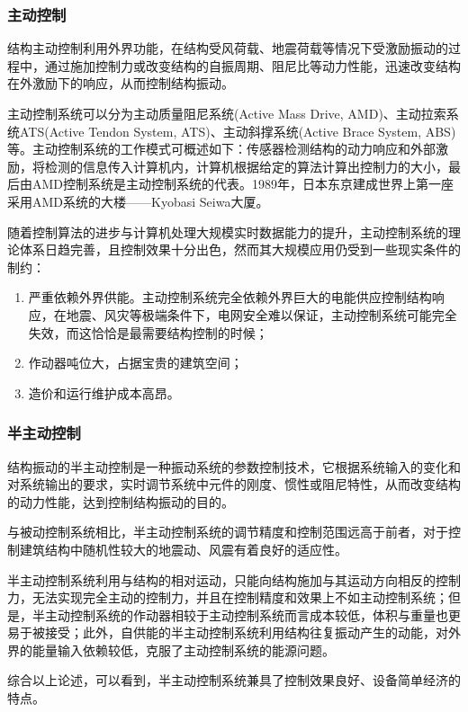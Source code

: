 \subsubsection{主动控制}
结构主动控制利用外界功能，在结构受风荷载、地震荷载等情况下受激励振动的过程中，通过施加控制力或改变结构的自振周期、阻尼比等动力性能，迅速改变结构在外激励下的响应，从而控制结构振动。

主动控制系统可以分为主动质量阻尼系统(Active Mass Drive, AMD)、主动拉索系统ATS(Active Tendon System, ATS)、主动斜撑系统(Active Brace System, ABS)等。主动控制系统的工作模式可概述如下：传感器检测结构的动力响应和外部激励，将检测的信息传入计算机内，计算机根据给定的算法计算出控制力的大小，最后由AMD控制系统是主动控制系统的代表。1989年，日本东京建成世界上第一座采用AMD系统的大楼——Kyobasi Seiwa大厦\cite{T.KoboriN.KoshikaN.Yamada1991}。

随着控制算法的进步与计算机处理大规模实时数据能力的提升，主动控制系统的理论体系日趋完善，且控制效果十分出色，然而其大规模应用仍受到一些现实条件的制约：
\begin{enumerate}
	\item 严重依赖外界供能。主动控制系统完全依赖外界巨大的电能供应控制结构响应，在地震、风灾等极端条件下，电网安全难以保证，主动控制系统可能完全失效，而这恰恰是最需要结构控制的时候；
	\item 作动器吨位大，占据宝贵的建筑空间\cite{lou2013}；
	\item 造价和运行维护成本高昂。
\end{enumerate}

\subsubsection{半主动控制}
结构振动的半主动控制是一种振动系统的参数控制技术，它根据系统输入的变化和对系统输出的要求，实时调节系统中元件的刚度、惯性或阻尼特性，从而改变结构的动力性能，达到控制结构振动的目的。

与被动控制系统相比，半主动控制系统的调节精度和控制范围远高于前者，对于控制建筑结构中随机性较大的地震动、风震有着良好的适应性。

半主动控制系统利用与结构的相对运动，只能向结构施加与其运动方向相反的控制力，无法实现完全主动的控制力，并且在控制精度和效果上不如主动控制系统；但是，半主动控制系统的作动器相较于主动控制系统而言成本较低，体积与重量也更易于被接受；此外，自供能的半主动控制系统利用结构往复振动产生的动能，对外界的能量输入依赖较低，克服了主动控制系统的能源问题。

综合以上论述，可以看到，半主动控制系统兼具了控制效果良好、设备简单经济的特点。

